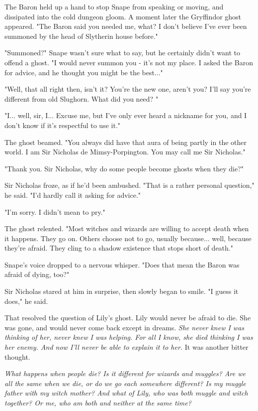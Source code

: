 The Baron held up a hand to stop Snape from speaking or moving, and dissipated into the cold dungeon gloom. A moment later the Gryffindor ghost appeared. "The Baron said you needed me, what? I don't believe I've ever been summoned by the head of Slytherin house before."

"Summoned?" Snape wasn't sure what to say, but he certainly didn't want to offend a ghost. "I would never summon you - it's not my place. I asked the Baron for advice, and he thought you might be the best..."

"Well, that all right then, isn't it? You're the new one, aren't you? I'll say you're different from old Slughorn. What did you need? "

"I... well, sir, I... Excuse me, but I've only ever heard a nickname for you, and I don't know if it's respectful to use it."

The ghost beamed. "You always did have that aura of being partly in the other world. I am Sir Nicholas de Mimsy-Porpington. You may call me Sir Nicholas."

"Thank you. Sir Nicholas, why do some people become ghosts when they die?"

Sir Nicholas froze, as if he'd been ambushed. "That is a rather personal question," he said. "I'd hardly call it asking for advice."

"I'm sorry. I didn't mean to pry."

The ghost relented. "Most witches and wizards are willing to accept death when it happens. They go on. Others choose not to go, usually because... well, because they're afraid. They cling to a shadow existence that stops short of death."

Snape's voice dropped to a nervous whisper. "Does that mean the Baron was afraid of dying, too?"

Sir Nicholas stared at him in surprise, then slowly began to smile. "I guess it does," he said.

That resolved the question of Lily's ghost. Lily would never be afraid to die. She was gone, and would never come back except in dreams. \emph{She never knew I was thinking of her, never knew I was helping. For all I know, she died thinking I was her enemy. And now I'll never be able to explain it to her.} It was another bitter thought.

\emph{What happens when people die? Is it different for wizards and muggles? Are we all the same when we die, or do we go each somewhere different? Is my muggle father with my witch mother? And what of Lily, who was both muggle and witch together? Or me, who am both and neither at the same time?}

